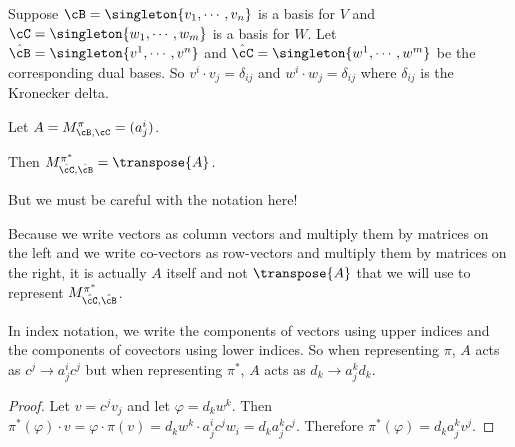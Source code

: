 \documentclass[oneside,12pt]{amsart}
\begin{document}
\begin{lemma}
Suppose $\cB = \singleton{v_1,\cdots,v_n}$ is a basis for $V$ and
$\cC=\singleton{w_1,\cdots,w_m}$ is a basis for $W$. Let
$\hat{\cB} = \singleton{v^1,\cdots,v^n}$ and
$\hat{\cC} = \singleton{w^1,\cdots,w^m}$ be the corresponding
dual bases. So $v^i \cdot v_j = \delta_{ij}$ and $w^i \cdot w_j = \delta_{ij}$
where $\delta_{ij}$ is the Kronecker delta.

Let $A = M^{\pi}_{\cB,\cC} =(a^i_j)$.

Then $M^{\pi^*}_{\hat{\cC},\hat{\cB}}  = \transpose{A}$.

But we must be careful with the notation here!

Because we write vectors as column vectors and multiply them by matrices on the left
and we write co-vectors as row-vectors and multiply them by matrices on the right, it
is actually $A$ itself and not $\transpose{A}$ that we will use to represent
$M^{\pi^*}_{\hat{\cC},\hat{\cB}}$.


In index notation, we write the components of vectors using upper indices and the components
of covectors using lower indices. So when representing $\pi$, $A$ acts as
$c^j \to a^i_jc^j$ but when representing $\pi^*$, $A$ acts as $d_k \to a^k_j d_k$.
\end{lemma}
\begin{proof}
Let $v=c^j v_j$ and let $\varphi = d_k w^k$. Then $\pi^*(\varphi)\cdot v = \varphi \cdot \pi(v)
= d_k w^k \cdot a^i_j c^j w_i = d_k a^k_j c ^ j$. Therefore $\pi^*(\varphi) = d_k a^k_j v^j$.
\end{proof}





\end{document}
